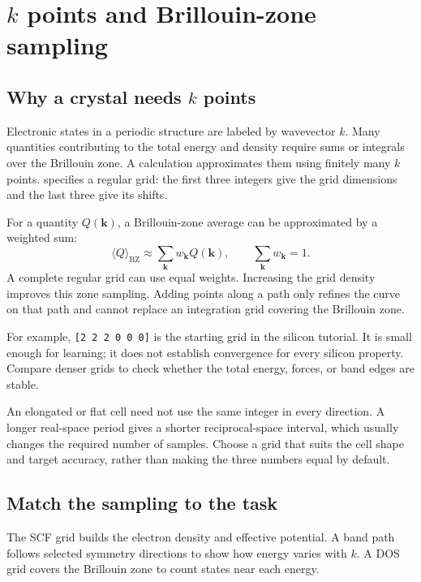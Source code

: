 \section{$k$ points and Brillouin-zone sampling}

\subsection{Why a crystal needs $k$ points}

Electronic states in a periodic structure are labeled by wavevector $k$. Many quantities contributing to the total energy and density require sums or integrals over the Brillouin zone. A calculation approximates them using finitely many $k$ points. \mbox{} specifies a regular grid: the first three integers give the grid dimensions and the last three give its shifts.

For a quantity $Q(\mathbf k)$, a Brillouin-zone average can be approximated by a weighted sum:
\begin{equation}
  \langle Q\rangle_{\mathrm{BZ}}
      \approx\sum_{\mathbf k}w_{\mathbf k}Q(\mathbf k),
  \qquad \sum_{\mathbf k}w_{\mathbf k}=1.
  \label{eq:k-point-average}
\end{equation}
A complete regular grid can use equal weights. Increasing the grid density improves this zone sampling. Adding points along a path only refines the curve on that path and cannot replace an integration grid covering the Brillouin zone.

For example, \mbox{\texttt{[2 2 2 0 0 0]}} is the starting grid in the silicon tutorial. It is small enough for learning; it does not establish convergence for every silicon property. Compare denser grids to check whether the total energy, forces, or band edges are stable.

An elongated or flat cell need not use the same integer in every direction. A longer real-space period gives a shorter reciprocal-space interval, which usually changes the required number of samples. Choose a grid that suits the cell shape and target accuracy, rather than making the three numbers equal by default.

\subsection{Match the sampling to the task}

The SCF grid builds the electron density and effective potential. A band path follows selected symmetry directions to show how energy varies with $k$. A DOS grid covers the Brillouin zone to count states near each energy.

